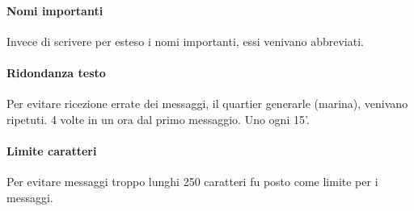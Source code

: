 \paragraph{Nomi importanti}
Invece di scrivere per esteso i nomi importanti, essi venivano
abbreviati.

\paragraph{Ridondanza testo}
Per evitare ricezione errate dei messaggi, il quartier generarle (marina), venivano ripetuti.
4 volte in un ora dal primo messaggio. Uno ogni 15'.

\paragraph{Limite caratteri}
Per evitare messaggi troppo lunghi 250 caratteri fu posto come limite per i messaggi.
